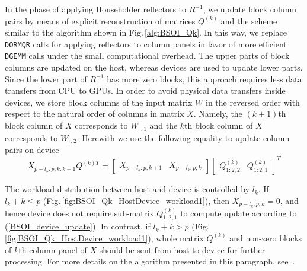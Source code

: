 \documentclass{llncs}
\begin{document}
    In the phase of applying Householder reflectors to $R^{-1}$,
    we update block column pairs by means of 
    explicit reconstruction of matrices $Q^{(k)}$
    and the scheme similar to the algorithm shown in Fig.\,\ref{alg:BSOI_Qk}.
    In this way, 
    we replace {\tt DORMQR} calls for applying reflectors to column panels 
    in favor of more efficient {\tt DGEMM} calls
    under the small computational overhead.
    The upper parts of block columns are updated on the host, 
    whereas devices are used to update lower parts. 
    Since the lower part of $R^{-1}$ has more zero blocks,
    this approach requires less data transfers from CPU to GPUs.
    In order to avoid physical data transfers inside devices,
    we store block columns of the input matrix $W$ in the reversed order 
    with respect to the natural order of columns in matrix $X$. 
    Namely, the $(k+1)$th block column of $X$ 
    corresponds to ${W}_{:,1}$ and 
    the $k$th block column of $X$ 
    corresponds to ${W}_{:,2}$.
    Herewith we use the following equality to update column pairs on device 
    \begin{equation}
      \label{BSOI_device_update}
      X_{p-l_k:p,k:k+1}   Q^{{(k)}T} = 
      \begin{bmatrix}
        X_{p-l_k:p,k+1} & X_{p-l_k:p,k}
      \end{bmatrix} 
      \begin{bmatrix}
        Q^{(k)}_{1:2,2} & Q^{(k)}_{1:2,1}
      \end{bmatrix}^T  
    \end{equation}

    The workload distribution between host and device is controlled by $l_k$. 
    If $l_k + k \leq p$ (Fig.\,\ref{fig:BSOI_Qk_HostDevice_workload1}),
    then $X_{p-l_k:p,k}=0$,
    and hence device does not require sub-matrix $Q^{(k)}_{1:2,1}$
    to compute update according to (\ref{BSOI_device_update}).
    In contrast,
    if $l_k + k > p$ (Fig.\,\ref{fig:BSOI_Qk_HostDevice_workload1}),
    whole matrix $Q^{(k)}$ and non-zero blocks of $k$th column panel of $X$
    should be sent from host to device for further processing.
    For more details on the algorithm presented in this paragraph,
    see~\cite{GogolenkoBai13}.

\end{document}
